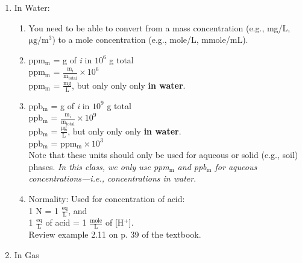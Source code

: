\documentclass[12pt,letterpaper]{article}
\begin{document}
\begin{enumerate}
\item In Water:
\begin{enumerate}
\item You need to be able to convert from a mass concentration (e.g., mg/L, $\mathrm{\mu g/m^3}$) to a mole concentration (e.g., mole/L, mmole/mL).

\item ppm$\mathrm{_m}$ = g of \emph{i} in $10^6$ g total\\

ppm$\mathrm{_m}$ = $\mathrm{\frac{m_i}{m_{total}}\times 10^6}$\\

ppm$\mathrm{_m}$ = $\mathrm{\frac{mg}{L}}$, but only only only \textbf{in water}.\\

\item ppb$\mathrm{_m}$ = g of \emph{i} in $10^9$ g total\\

ppb$\mathrm{_m}$ = $\mathrm{\frac{m_i}{m_{total}}\times 10^9}$\\

ppb$\mathrm{_m}$ = $\mathrm{\frac{\mu g}{L}}$, but only only only \textbf{in water}.\\

ppb$\mathrm{_m}$ = ppm$\mathrm{_m}\times 10^3$\\

Note that these units should only be used for aqueous or solid (e.g., soil) phases.  \emph{In this class, we only use ppm$\mathrm{_m}$ and ppb$\mathrm{_m}$ for aqueous concentrations---i.e., concentrations in water}.

\item Normality: Used for concentration of acid:\\

1 N = 1 $\mathrm{\frac{eq}{L}}$, and\\

1 $\mathrm{\frac{eq}{L}}$ of acid = 1 $\mathrm{\frac{mole}{L}}$ of [H$^+$].\\

Review example 2.11 on p. 39 of the textbook.

\end{enumerate}

\item In Gas\\
\begin{enumerate}


\end{enumerate}
\end{enumerate}
\end{document}
